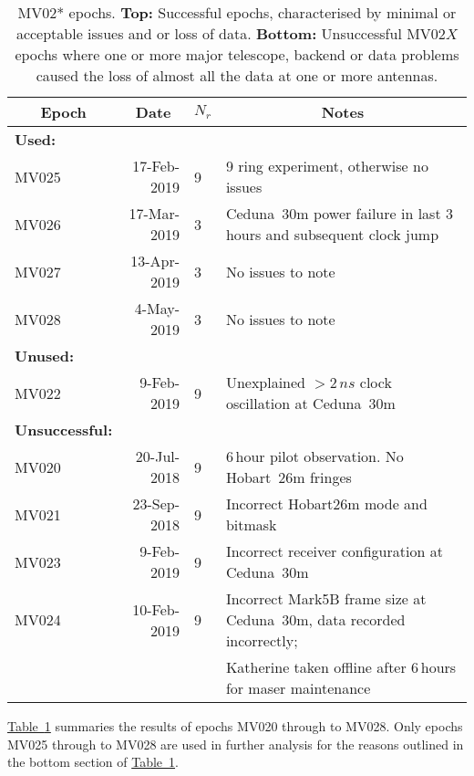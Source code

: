 	    \begin{table}[h]
	    	\footnotesize
	    	\centering
	    	\caption[MV observational epochs]{MV02* epochs. \textbf{Top:} Successful epochs, characterised by minimal or acceptable issues and or loss of data. \textbf{Bottom:} Unsuccessful MV02$X$ epochs where one or more major telescope, backend or data problems caused the loss of almost all the data at one or more antennas. }
	    	{\onehalfspacing
	    		\begin{tabular}{lrll} \hline
	    \multicolumn{1}{c}{\bf Epoch} & \multicolumn{1}{c}{\bf Date} & \multicolumn{1}{c}{\bf $N_{r}$} & \multicolumn{1}{c}{\bf Notes} \\ 		
	    \hline
	    {\bf Used:} &&& \\
	    MV025  & 17-Feb-2019 & 9    &  9 ring experiment, otherwise no issues   \\\hline
	    MV026  & 17-Mar-2019 & 3    &  Ceduna~30m power failure in last 3 hours and subsequent clock jump  \\
	    MV027  & 13-Apr-2019 & 3    &  No issues to note  \\
	    MV028  &  4-May-2019 & 3    &  No issues to note  \\\hline
	    \hline
	    {\bf Unused:} &&& \\
	    MV022  &  9-Feb-2019 & 9    &  Unexplained $> 2\,ns$ clock oscillation at Ceduna~30m \\
	    {\bf Unsuccessful:} &&& \\
	    MV020  & 20-Jul-2018 & 9    &  6\,hour pilot observation. No Hobart~26m fringes \\
	    MV021  & 23-Sep-2018 & 9    &  Incorrect Hobart26m mode and bitmask \\
	    MV023  &  9-Feb-2019 & 9    &  Incorrect receiver configuration at Ceduna~30m \\
	    MV024  & 10-Feb-2019 & 9    &  Incorrect Mark5B frame size at Ceduna~30m, data recorded incorrectly; \\ &&& Katherine taken offline after 6\,hours for maser maintenance \\
	    \hline
	    		\end{tabular}
	    	}
	    \label{tab:multiviewepochs}
    	\end{table}
		\hyperref[tab:multiviewepochs]{Table~\ref*{tab:multiviewepochs}} summaries the results of epochs MV020 through to MV028. Only epochs MV025 through to MV028 are used in further analysis for the reasons outlined in the bottom section of \hyperref[tab:multiviewepochs]{Table~\ref*{tab:multiviewepochs}}.

